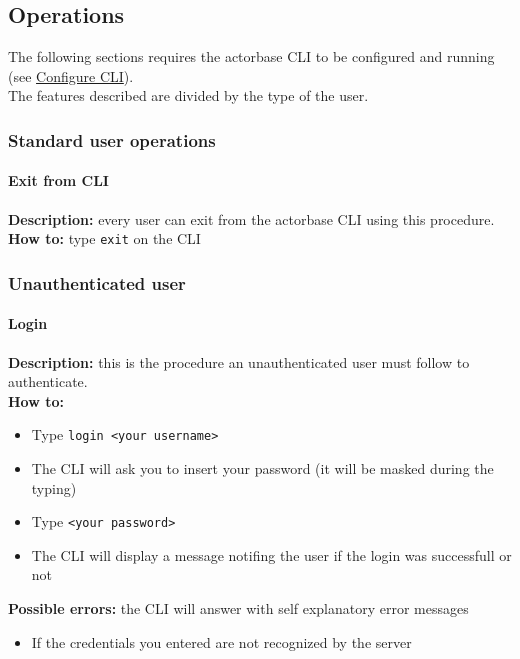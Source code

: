 \documentclass{scalatekids-article}
\begin{document}
\subsection{Operations}

The following sections requires the actorbase CLI to be configured and 
running (see \hyperref[sec:configurationcli]{Configure CLI}).\\
The features described are divided by the type of the user.

\subsubsection{Standard user operations}
\label{sec:everyuser}
\paragraph{Exit from CLI}

\textbf{Description:} every user can exit from the actorbase CLI 
using this procedure.\\
\textbf{How to:} type \texttt{exit} on the CLI

\subsubsection{Unauthenticated user}
\label{sec:unauthenticateduser}

\paragraph{Login}

\textbf{Description:} this is the procedure an unauthenticated user must follow to authenticate.\\
\textbf{How to:} 
\begin{itemize}
	\item Type \texttt{login <your username>}
	\item The CLI will ask you to insert your password (it will be masked during the typing)
	\item Type \texttt{<your password>} 
	\item The CLI will display a message notifing the user if the login was successfull or not
\end{itemize}
\textbf{Possible errors:} the CLI will answer with self explanatory error messages
\begin{itemize}
	\item If the credentials you entered are not recognized by the server
\end{itemize}
\end{document}
